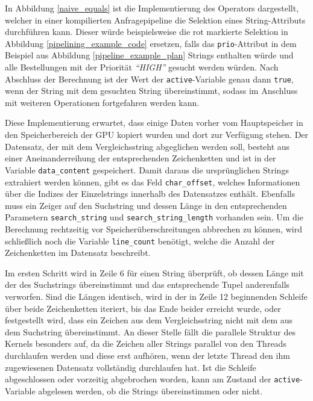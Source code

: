 In Abbildung \ref{naive_equals} ist die Implementierung des Operators dargestellt, welcher in einer kompilierten Anfragepipeline die Selektion eines String-Attributs durchführen kann.
Dieser würde beispielsweise die rot markierte Selektion in Abbildung \ref{pipelining_example_code} ersetzen, falls das \texttt{prio}-Attribut in dem Beispiel aus Abbildung \ref{pipeline_example_plan} Strings enthalten würde und alle Bestellungen mit der Priorität \emph{\enquote{HIGH}} gesucht werden würden.
Nach Abschluss der Berechnung ist der Wert der \texttt{active}-Variable genau dann \texttt{true}, wenn der String mit dem gesuchten String übereinstimmt, sodass im Anschluss mit weiteren Operationen fortgefahren werden kann.

Diese Implementierung erwartet, dass einige Daten vorher vom Hauptspeicher in den Speicherbereich der GPU kopiert wurden und dort zur Verfügung stehen.
Der Datensatz, der mit dem Vergleichsstring abgeglichen werden soll, besteht aus einer Aneinanderreihung der entsprechenden Zeichenketten und ist in der Variable \texttt{data\_content} gespeichert.
Damit daraus die ursprünglichen Strings extrahiert werden können, gibt es das Feld \texttt{char\_offset}, welches Informationen über die Indizes der Einzelstrings innerhalb des Datensatzes enthält.
Ebenfalls muss ein Zeiger auf den Suchstring und dessen Länge in den entsprechenden Parametern \texttt{search\_string} und \texttt{search\_string\_length} vorhanden sein.
Um die Berechnung rechtzeitig vor Speicherüberschreitungen abbrechen zu können, wird schließlich noch die Variable \texttt{line\_count} benötigt, welche die Anzahl der Zeichenketten im Datensatz beschreibt.

Im ersten Schritt wird in Zeile 6 für einen String überprüft, ob dessen Länge mit der des Suchstrings übereinstimmt und das entsprechende Tupel anderenfalls verworfen.
Sind die Längen identisch, wird in der in Zeile 12 beginnenden Schleife über beide Zeichenketten iteriert, bis das Ende beider erreicht wurde, oder festgestellt wird, dass ein Zeichen aus dem Vergleichsstring nicht mit dem aus dem Suchstring übereinstimmt.
An dieser Stelle fällt die parallele Struktur des Kernels besonders auf, da die Zeichen aller Strings parallel von den Threads durchlaufen werden und diese erst aufhören, wenn der letzte Thread den ihm zugewiesenen Datensatz vollständig durchlaufen hat.
Ist die Schleife abgeschlossen oder vorzeitig abgebrochen worden, kann am Zustand der \texttt{active}-Variable abgelesen werden, ob die Strings übereinstimmen oder nicht.

